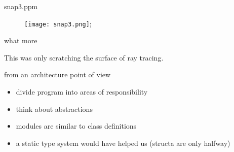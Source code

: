 \begin{frame}{snap3.ppm}

\begin{figure}
\texttt{[image: snap3.png]};
\end{figure}

\end{frame}


\begin{frame}{what more}

This was only scratching the surface of ray tracing.

\end{frame}

\begin{frame}{from an architecture point of view}

\begin{itemize}
 \pause \item divide program into areas of responsibility
 \pause \item think about abstractions
 \pause \item modules are similar to class definitions
 \pause \item a static type system would have helped us (structa are only halfway)
\end{itemize}

\end{frame}


